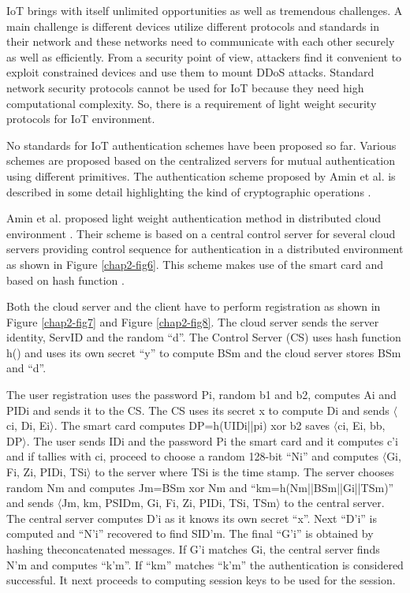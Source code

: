 \begin{multicols}{2}
IoT brings with itself unlimited opportunities as well as tremendous challenges. A main challenge is different devices utilize different protocols and standards in their network and these networks need to communicate with each other securely as well as efficiently. From a security point of view, attackers find it convenient to exploit constrained devices and use them to mount DDoS attacks. Standard network security protocols cannot be used for IoT because they need high computational complexity. So, there is a requirement of light weight security protocols for IoT environment.

No standards for IoT authentication schemes have been proposed so far. Various schemes are proposed based on the centralized servers for mutual authentication using different primitives. The authentication scheme proposed by Amin et al. is described in some detail highlighting the kind of cryptographic operations \cite{chap2-key22}.

Amin et al. proposed light weight authentication method in distributed cloud environment \cite{chap2-key19}. Their scheme is based on a central control server for several cloud servers providing control sequence for authentication in a distributed environment as shown in Figure \ref{chap2-fig6}. This scheme makes use of the smart card and based on hash function \cite{chap2-key23}.

Both the cloud server and the client have to perform registration as shown in Figure \ref{chap2-fig7} and Figure \ref{chap2-fig8}. The cloud server sends the server identity, ServID and the random ``d''. The Control Server (CS) uses hash function h() and uses its own secret ``y'' to compute BSm and the cloud server stores BSm and ``d''.

The user registration uses the password Pi, random b1 and b2, computes Ai and PIDi and sends it to the CS. The CS uses its secret x to compute Di and sends $\langle$ci, Di, Ei$\rangle$. The smart card computes DP=h(UIDi||pi) xor b2 saves $\langle$ci, Ei, bb, DP$\rangle$. The user sends IDi and the password Pi the smart card and it computes c'i and if tallies with ci, proceed to choose a random 128-bit ``Ni'' and computes  $\langle$Gi, Fi, Zi, PIDi, TSi$\rangle$ to the server where TSi is the time stamp. The server chooses random Nm and computes Jm=BSm xor Nm and ``km=h(Nm||BSm||Gi||TSm)'' and sends $\langle$Jm, km, PSIDm, Gi, Fi, Zi, PIDi, TSi, TSm$\rangle$ to the central server. The central server computes D'i as it knows its own secret ``x''. Next ``D'i'' is computed and ``N'i'' recovered to find SID'm. The final ``G'i'' is obtained by hashing the\break concatenated messages. If G'i matches Gi, the central server finds N'm and computes ``k'm''. If ``km'' matches ``k'm'' the authentication is considered successful. It next proceeds to computing session keys to be used for the session.


\end{multicols}

